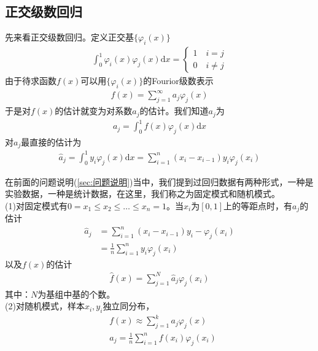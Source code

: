     \subsection{正交级数回归}
        \par
        先来看正交级数回归。定义正交基$\{\varphi_i(x)\}$
        \begin{align*}
        \int_0^1\varphi_i(x)\varphi_j(x)\mathrm{d}x =
        \left\{
        \begin{aligned}
        1 \quad i = j\\
        0 \quad i \neq j
        \end{aligned}
        \right.
        \end{align*}
        由于待求函数$f(x)$可以用$\{\varphi_i(x)\}$的Fourior级数表示
        \begin{align*}
        f(x) = \sum_{j=1}^\infty a_j\varphi_j(x)
        \end{align*}
        于是对$f(x)$的估计就变为对系数$a_j$的估计。我们知道$a_j$为
        \begin{align*}
        a_j = \int_0^1f(x)\varphi_j(x)\mathrm{d}x
        \end{align*}
        对$a_j$最直接的估计为
        \begin{align*}
        \hat{a}_j = \int_0^1y_i\varphi_j(x)\mathrm{d}x = \sum_{i=1}^n(x_i-x_{i-1})y_i\varphi_j(x_i)
        \end{align*}
        \par
        在前面的问题说明(\ref{sec:问题说明})当中，我们提到过回归数据有两种形式，一种是实验数据，一种是统计数据，在这里，我们称之为固定模式和随机模式。\\
        (1)对固定模式有$0=x_1 \leqslant x_2 \leqslant\dots \leqslant x_n=1 $。当$x_i$为$[0,1]$上的等距点时，有$a_j$的估计
        \begin{align*}
        \hat{a}_j &= \sum_{i=1}^n(x_i-x_{i-1})y_i - \varphi_j(x_i) \\
        &= \frac{1}{n}\sum_{i=1}^ny_i\varphi_j(x_i)
        \end{align*}
        以及$f(x)$的估计
        \begin{align*}
        \hat{f}(x) = \sum_{j=1}^N\hat{a}_j\varphi_j(x_i)
        \end{align*}
        其中：$N$为基组中基的个数。\\
        (2)对随机模式，样本$x_i,y_i$独立同分布，
        \begin{align*}
        & f(x) \approx \sum_{j=1}^ka_j\varphi_j(x)\\
        & a_j = \frac{1}{n}\sum_{i=1}^nf(x_i)\varphi_j(x_i)
        \end{align*}
